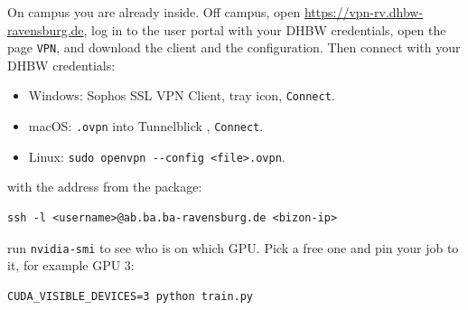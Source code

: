On campus you are already inside. Off campus, open
\url{https://vpn-rv.dhbw-ravensburg.de}, log in to the user portal with
your DHBW credentials, open the page \texttt{VPN}, and download the
client and the configuration. Then connect with your DHBW credentials:
\begin{itemize}[nosep]
  \item Windows: Sophos SSL VPN Client, tray icon, \texttt{Connect}.
  \item macOS: \texttt{.ovpn} into Tunnelblick \cite{tunnelblick2026}, \texttt{Connect}.
  \item Linux: \texttt{sudo openvpn -{}-config <file>.ovpn}.
\end{itemize}

 with the address from the package:
\begin{verbatim}
ssh -l <username>@ab.ba.ba-ravensburg.de <bizon-ip>
\end{verbatim}

 run
\texttt{nvidia-smi} to see who is on which GPU. Pick a free one and pin
your job to it, for example GPU 3:
\begin{verbatim}
CUDA_VISIBLE_DEVICES=3 python train.py
\end{verbatim}
